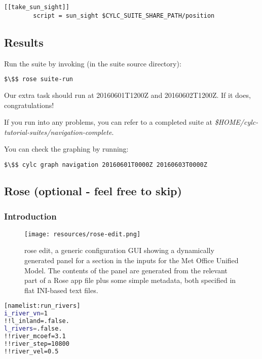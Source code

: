 \lstset{language=suiterc}
\begin{lstlisting}[columns=fullflexible]
    [[take_sun_sight]]
        script = sun_sight $CYLC_SUITE_SHARE_PATH/position
\end{lstlisting}

\subsection{Results}

Run the suite by invoking (in the suite source directory):
\begin{lstlisting}[mathescape, language=bash]
$\$$ rose suite-run
\end{lstlisting}

Our extra task should run at 20160601T1200Z and 20160602T1200Z. If it does, congratulations!

If you run into any problems, you can refer to a completed suite at {\em \$HOME/cylc-tutorial-suites/navigation-complete}.

You can check the graphing by running:

\begin{lstlisting}[mathescape, language=bash]
$\$$ cylc graph navigation 20160601T0000Z 20160603T0000Z
\end{lstlisting}

\subsection{Rose (optional - feel free to skip)}
\label{Rose}

\subsubsection{Introduction}

\begin{figure}[h]
\texttt{[image: resources/rose-edit.png]}
\caption{rose edit, a generic configuration GUI showing a dynamically generated panel for a section in the inputs for the Met Office Unified Model. The contents of the panel are generated from the relevant part of a Rose app file plus some simple metadata, both specified in flat INI-based text files. \label{rose edit}}
\end{figure}

\begin{lstlisting}[mathescape, language=bash, title={rose-app.conf snippet used to drive Figure~\ref{rose edit}}]
[namelist:run_rivers]
i_river_vn=1
!!l_inland=.false.
l_rivers=.false.
!!river_mcoef=3.1
!!river_step=10800
!!river_vel=0.5
\end{lstlisting}

